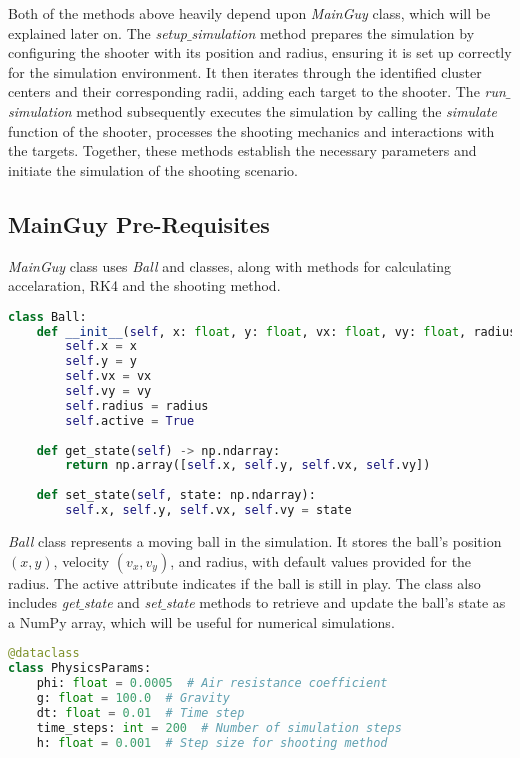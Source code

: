 \documentclass{article}
\begin{document}
	Both of the methods above heavily depend upon \textit{MainGuy} class, which will be explained later on. The \textit{setup$\_$simulation} method prepares the simulation by configuring the shooter with its position and radius, ensuring it is set up correctly for the simulation environment. It then iterates through the identified cluster centers and their corresponding radii, adding each target to the shooter. The \textit{run$\_$simulation} method subsequently executes the simulation by calling the \textit{simulate} function of the shooter, processes the shooting mechanics and interactions with the targets. Together, these methods establish the necessary parameters and initiate the simulation of the shooting scenario.
	
	\subsection*{MainGuy Pre-Requisites}
	
	\textit{MainGuy} class uses \textit{Ball} and  classes, along with methods for calculating accelaration, RK4 and the shooting method.
	
	 
\begin{lstlisting}[language=python]
class Ball:
	def __init__(self, x: float, y: float, vx: float, vy: float, radius: float = 5.0):
		self.x = x
		self.y = y
		self.vx = vx
		self.vy = vy
		self.radius = radius
		self.active = True
	
	def get_state(self) -> np.ndarray:
		return np.array([self.x, self.y, self.vx, self.vy])
	
	def set_state(self, state: np.ndarray):
		self.x, self.y, self.vx, self.vy = state
\end{lstlisting}
	
	\textit{Ball} class represents a moving ball in the simulation. It stores the ball's position $(x, y)$, velocity $(v_x, v_y)$, and radius, with default values provided for the radius. The active attribute indicates if the ball is still in play. The class also includes \textit{get$\_$state} and \textit{set$\_$state} methods to retrieve and update the ball's state as a NumPy array, which will be useful for numerical simulations.
	
	
\begin{lstlisting}[language=python]
@dataclass
class PhysicsParams:
	phi: float = 0.0005  # Air resistance coefficient
	g: float = 100.0  # Gravity
	dt: float = 0.01  # Time step
	time_steps: int = 200  # Number of simulation steps
	h: float = 0.001  # Step size for shooting method
\end{lstlisting}
\end{document}
